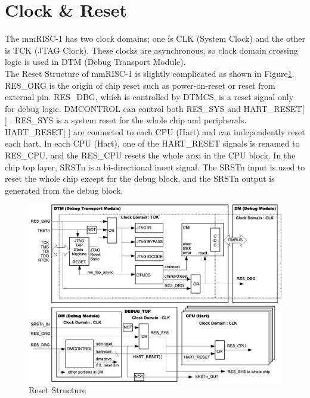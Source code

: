 \section{Clock \& Reset}

The mmRISC-1 has two clock domains; one is CLK (System Clock) and the other is TCK (JTAG Clock). These clocks are asynchronous, so clock domain crossing logic is used in DTM (Debug Transport Module).\\
The Reset Structure of mmRISC-1 is slightly  complicated as shown in Figure\ref{fig:RESET}. RES\_ORG is the origin of chip reset such as power-on-reset or reset from external pin. RES\_DBG, which is controlled by DTMCS, is a reset signal only for debug logic.  DMCONTROL can control both RES\_SYS and HART\_RESET[ ] . RES\_SYS is a system reset for the whole chip and peripherals. HART\_RESET[ ] are connected to each CPU (Hart) and can independently reset each hart. In each CPU (Hart), one of the HART\_RESET signals is renamed to RES\_CPU, and the RES\_CPU resets the whole area in the CPU block. In the chip top layer, SRSTn is a bi-directional inout signal. The SRSTn input is used to reset the whole chip except for the debug block, and the SRSTn output is generated from the debug block.\\

\begin{figure}[H]
    \includegraphics[width=1.00\columnwidth]{./Figure/Reset.png}
    \caption{Reset Structure}
    \label{fig:RESET}
\end{figure}


